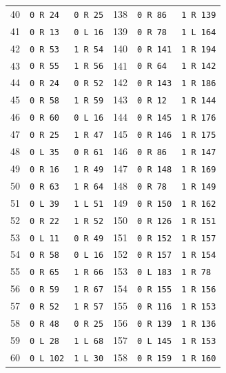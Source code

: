 \begin{longtable}{rll@{\qquad}rll}
40 & \texttt{0 R 24} & \texttt{0 R 25} & 138 & \texttt{0 R 86} & \texttt{1 R 139}\\
41 & \texttt{0 R 13} & \texttt{0 L 16} & 139 & \texttt{0 R 78} & \texttt{1 L 164}\\
42 & \texttt{0 R 53} & \texttt{1 R 54} & 140 & \texttt{0 R 141} & \texttt{1 R 194}\\
43 & \texttt{0 R 55} & \texttt{1 R 56} & 141 & \texttt{0 R 64} & \texttt{1 R 142}\\
44 & \texttt{0 R 24} & \texttt{0 R 52} & 142 & \texttt{0 R 143} & \texttt{1 R 186}\\
45 & \texttt{0 R 58} & \texttt{1 R 59} & 143 & \texttt{0 R 12} & \texttt{1 R 144}\\
46 & \texttt{0 R 60} & \texttt{0 L 16} & 144 & \texttt{0 R 145} & \texttt{1 R 176}\\
47 & \texttt{0 R 25} & \texttt{1 R 47} & 145 & \texttt{0 R 146} & \texttt{1 R 175}\\
48 & \texttt{0 L 35} & \texttt{0 R 61} & 146 & \texttt{0 R 86} & \texttt{1 R 147}\\
49 & \texttt{0 R 16} & \texttt{1 R 49} & 147 & \texttt{0 R 148} & \texttt{1 R 169}\\
50 & \texttt{0 R 63} & \texttt{1 R 64} & 148 & \texttt{0 R 78} & \texttt{1 R 149}\\
51 & \texttt{0 L 39} & \texttt{1 L 51} & 149 & \texttt{0 R 150} & \texttt{1 R 162}\\
52 & \texttt{0 R 22} & \texttt{1 R 52} & 150 & \texttt{0 R 126} & \texttt{1 R 151}\\
53 & \texttt{0 L 11} & \texttt{0 R 49} & 151 & \texttt{0 R 152} & \texttt{1 R 157}\\
54 & \texttt{0 R 58} & \texttt{0 L 16} & 152 & \texttt{0 R 157} & \texttt{1 R 154}\\
55 & \texttt{0 R 65} & \texttt{1 R 66} & 153 & \texttt{0 L 183} & \texttt{1 R 78}\\
56 & \texttt{0 R 59} & \texttt{1 R 67} & 154 & \texttt{0 R 155} & \texttt{1 R 156}\\
57 & \texttt{0 R 52} & \texttt{1 R 57} & 155 & \texttt{0 R 116} & \texttt{1 R 153}\\
58 & \texttt{0 R 48} & \texttt{0 R 25} & 156 & \texttt{0 R 139} & \texttt{1 R 136}\\
59 & \texttt{0 L 28} & \texttt{1 L 68} & 157 & \texttt{0 L 145} & \texttt{1 R 153}\\
60 & \texttt{0 L 102} & \texttt{1 L 30} & 158 & \texttt{0 R 159} & \texttt{1 R 160}\\

\end{longtable}
